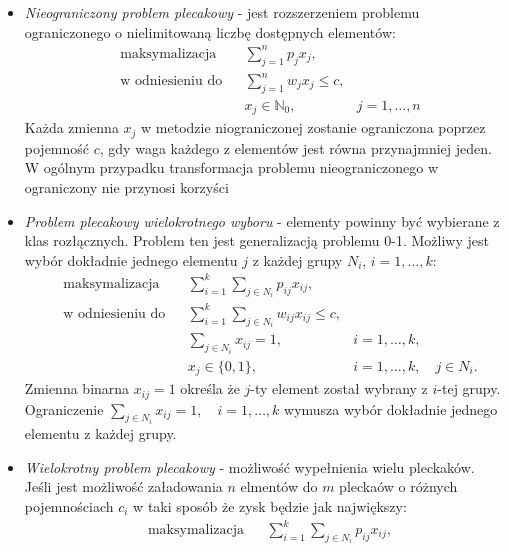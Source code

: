 \begin{itemize}
  \item \textit{Nieograniczony problem plecakowy} - jest rozszerzeniem problemu ograniczonego o nielimitowaną liczbę dostępnych elementów:
  \begin{equation}\label{unboundedKnapsack}
    \begin{aligned}
      & \textrm{maksymalizacja} & & \sum_{j=1}^n p_jx_j, \\
      & \textrm{w odniesieniu do} & & \sum_{j=1}^n w_jx_j \le c, \\
      &&& x_j \in \mathbb{N}_0,& j = 1,\dots,n
    \end{aligned}
  \end{equation}
  Każda zmienna $x_j$ w metodzie niograniczonej zostanie ograniczona poprzez pojemność $c$, gdy waga każdego z elementów jest równa przynajmniej jeden. W ogólnym przypadku transformacja problemu nieograniczonego w ograniczony nie przynosi korzyści
  \item \textit{Problem plecakowy wielokrotnego wyboru} - elementy powinny być wybierane z klas rozłącznych. Problem ten jest generalizacją problemu 0-1. Możliwy jest wybór dokładnie jednego elementu $j$ z każdej grupy $N_i$, $i=1,\dots,k$:
  \begin{equation}\label{multichoiceKnapsack}
    \begin{aligned}
      & \textrm{maksymalizacja} & & \sum_{i=1}^k \sum_{j \in N_i} p_{ij}x_{ij}, \\
      & \textrm{w odniesieniu do} & & \sum_{i=1}^k \sum_{j \in N_i} w_{ij}x_{ij} \le c, \\
      &&& \sum_{j \in N_i} x_{ij} = 1, & i =1,\dots,k, \\
      &&& x_j \in\{0,1\},& i = 1,\dots,k, \quad j \in N_i.
    \end{aligned}
  \end{equation}
  Zmienna binarna $x_{ij} = 1$ określa że $j$-ty element został wybrany z $i$-tej grupy. Ograniczenie $\sum_{j \in N_i} x_{ij} = 1, \quad i =1,\dots,k$ wymusza wybór dokładnie jednego elementu z każdej grupy.
  \item \textit{Wielokrotny problem plecakowy} - możliwość wypełnienia wielu pleckaków. Jeśli jest możliwość załadowania $n$ elmentów do $m$ pleckaów o różnych pojemnościach $c_i$ w taki sposób że zysk będzie jak największy:
  \begin{equation}\label{multiKnapsack}
    \begin{aligned}
      & \textrm{maksymalizacja} & & \sum_{i=1}^k \sum_{j \in N_i} p_{ij}x_{ij}, \\

\end{aligned}
\end{equation}
\end{itemize}
